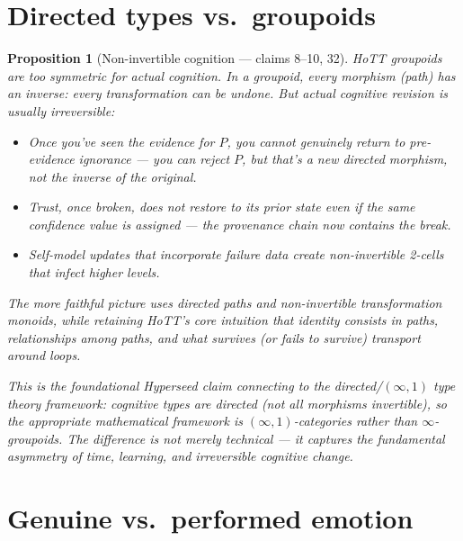 \documentclass[11pt,a4paper]{article}
\newtheorem{proposition}[definition]{Proposition}
\begin{document}
\section{Directed types vs.\ groupoids}
\label{sec:directed}

\begin{proposition}[Non-invertible cognition --- claims 8--10, 32]
\label{prop:directed}
HoTT groupoids are too symmetric for actual cognition. In a groupoid,
every morphism (path) has an inverse: every transformation can be undone.
But actual cognitive revision is usually irreversible:
\begin{itemize}
\item Once you've seen the evidence for $P$, you cannot genuinely return
  to pre-evidence ignorance --- you can reject $P$, but that's a
  \emph{new} directed morphism, not the inverse of the original.
\item Trust, once broken, does not restore to its prior state even if
  the same confidence value is assigned --- the provenance chain now
  contains the break.
\item Self-model updates that incorporate failure data create
  non-invertible 2-cells that infect higher levels.
\end{itemize}

The more faithful picture uses \emph{directed paths} and
\emph{non-invertible transformation monoids}, while retaining HoTT's
core intuition that identity consists in paths, relationships among
paths, and what survives (or fails to survive) transport around loops.

This is the foundational Hyperseed claim connecting to the
directed/$(\infty,1)$ type theory framework: cognitive types are
directed (not all morphisms invertible), so the appropriate mathematical
framework is $(\infty,1)$-categories rather than $\infty$-groupoids.
The difference is not merely technical --- it captures the fundamental
asymmetry of time, learning, and irreversible cognitive change.
\end{proposition}


\section{Genuine vs.\ performed emotion}
\label{sec:emotion}
\end{document}
